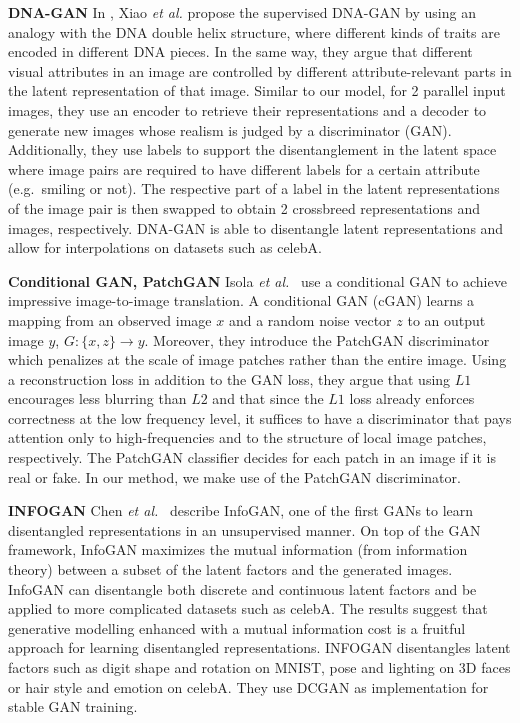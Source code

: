 \documentclass[a4paper,12pt]{report}
\begin{document}
\par \textbf{DNA-GAN} In \cite{DnaGan}, Xiao \textit{et al.} propose the supervised DNA-GAN by using an analogy with the DNA double helix structure, where different kinds of traits are encoded in different DNA pieces. In the same way, they argue that different visual attributes in an image are controlled by different attribute-relevant parts in the latent representation of that image. Similar to our model, for 2 parallel input images, they use an encoder to retrieve their representations and a decoder to generate new images whose realism is judged by a discriminator (GAN). Additionally, they use labels to support the disentanglement in the latent space where image pairs are required to have different labels for a certain attribute (e.g.\ smiling or not). The respective part of a label in the latent representations of the image pair is then swapped to obtain 2 crossbreed representations and images, respectively. DNA-GAN is able to disentangle latent representations and allow for interpolations on datasets such as celebA.

\par \textbf{Conditional GAN, PatchGAN} Isola \textit{et al.}~\cite{CondGAN_PatchGAN} use a conditional GAN to achieve impressive image-to-image translation. A conditional GAN (cGAN) learns a mapping from an observed image $x$ and a random noise vector $z$ to an output image $y$, $G : \{x,z\} \rightarrow y$. Moreover, they introduce the PatchGAN discriminator which penalizes at the scale of image patches rather than the entire image. Using a reconstruction loss in addition to the GAN loss, they argue that using $L1$ encourages less blurring than $L2$ and that since the $L1$ loss already enforces correctness at the low frequency level, it suffices to have a discriminator that pays attention only to high-frequencies and to the structure of local image patches, respectively. The PatchGAN classifier decides for each patch in an image if it is real or fake. In our method, we make use of the PatchGAN discriminator.

\par\textbf{INFOGAN} Chen \textit{et al.}~\cite{InfoGAN} describe InfoGAN, one of the first GANs to learn disentangled representations in an unsupervised manner. On top of the GAN framework, InfoGAN maximizes the mutual information (from information theory) between a subset of the latent factors and the generated images. InfoGAN can disentangle both discrete and continuous latent factors and be applied to more complicated datasets such as celebA. The results suggest that generative modelling enhanced with a mutual information cost is a fruitful approach for learning disentangled representations. INFOGAN disentangles latent factors such as digit shape and rotation on MNIST, pose and lighting on 3D faces or hair style and emotion on celebA. They use DCGAN as implementation for stable GAN training. 
\end{document}
